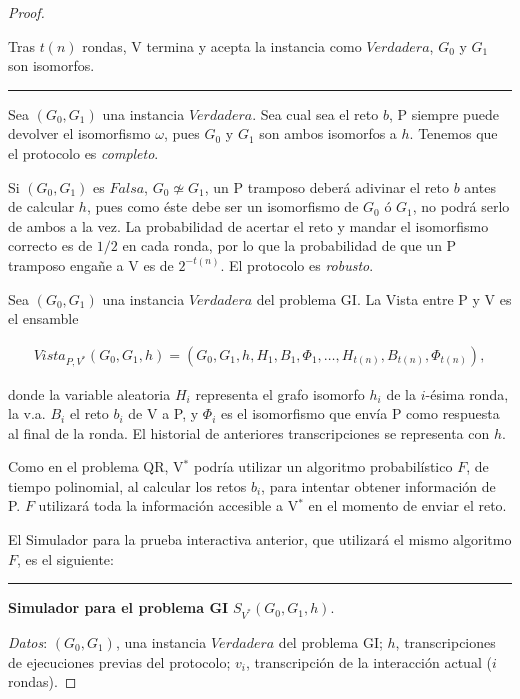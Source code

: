 \begin{proof}
\begin{algorithm}
		Tras $t(n)$ rondas, V termina y acepta la instancia como $Verdadera$, $G_0$ y $G_1$ son isomorfos.
		
		\label{GIinteractive:alg}
	\end{algorithm}
	\rule{\textwidth}{1pt}
	
	\hfil

	Sea $(G_0,G_1)$ una instancia $Verdadera$. Sea cual sea el reto $b$, P siempre puede devolver el isomorfismo $\omega$, pues $G_0$ y $G_1$ son ambos isomorfos a $h$. Tenemos que el protocolo es \textit{completo}.
	
	Si $(G_0,G_1)$ es $Falsa$, $G_0 \not\simeq G_1$, un P tramposo deberá adivinar el reto $b$ antes de calcular $h$, pues como éste debe ser un isomorfismo de $G_0$ ó $G_1$, no podrá serlo de ambos a la vez. La probabilidad de acertar el reto y mandar el isomorfismo correcto es de $1/2$ en cada ronda, por lo que la probabilidad de que un P tramposo engañe a V es de $2^{-t(n)}$. El protocolo es \textit{robusto}.
	
	\hfil
	
	Sea $(G_0, G_1)$ una instancia $Verdadera$ del problema GI. La Vista entre P y V es el ensamble
	
	\begin{align*}
		Vista_{P,V^*}(G_0, G_1, h) = (G_0, G_1, h,H_1,B_1,\Phi_1,\dots , H_{t(n)}, B_{t(n)}, \Phi_{t(n)}),
	\end{align*}

	donde la variable aleatoria $H_i$ representa el grafo isomorfo $h_i$ de la $i$-ésima ronda, la v.a. $B_i$ el reto $b_i$ de V a P, y $\Phi_i$ es el isomorfismo que envía P como respuesta al final de la ronda. El historial de anteriores transcripciones se representa con $h$.
	
	Como en el problema QR, V$^*$ podría utilizar un algoritmo probabilístico $F$, de tiempo polinomial, al calcular los retos $b_i$, para intentar obtener información de P. $F$ utilizará toda la información accesible a V$^*$ en el momento de enviar el reto.
	
	El Simulador para la prueba interactiva anterior, que utilizará el mismo algoritmo $F$, es el siguiente:
	
	
	\hfil 
	
	\rule{\textwidth}{1pt}
	
	\textbf{Simulador para el problema GI} $S_{V^*}(G_0, G_1 ,h)$.
	
	\hfil
	
	\textit{Datos}: \quad $(G_0, G_1)$, una instancia $Verdadera$ del problema GI; \quad $h$, transcripciones de ejecuciones previas del protocolo; \quad $v_i$, transcripción de la interacción actual ($i$ rondas).
	

\end{proof}
